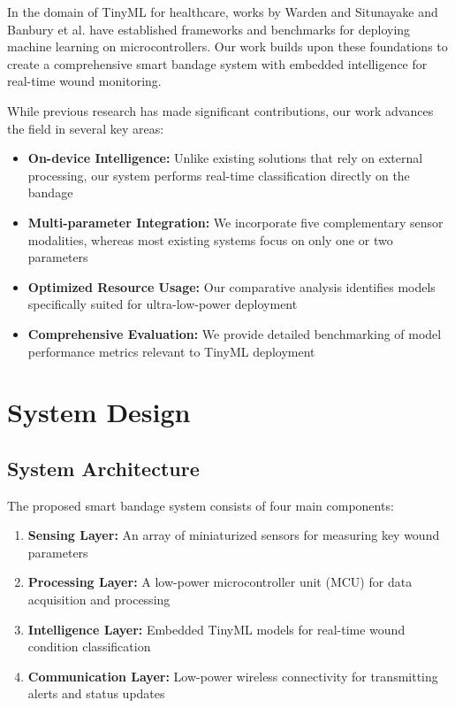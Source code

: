 \documentclass[conference]{IEEEtran}
\begin{document}
In the domain of TinyML for healthcare, works by Warden and Situnayake \cite{warden2019tinyml} and Banbury et al. \cite{banbury2020benchmarking} have established frameworks and benchmarks for deploying machine learning on microcontrollers. Our work builds upon these foundations to create a comprehensive smart bandage system with embedded intelligence for real-time wound monitoring.

While previous research has made significant contributions, our work advances the field in several key areas:
\begin{itemize}
    \item \textbf{On-device Intelligence:} Unlike existing solutions that rely on external processing, our system performs real-time classification directly on the bandage
    \item \textbf{Multi-parameter Integration:} We incorporate five complementary sensor modalities, whereas most existing systems focus on only one or two parameters
    \item \textbf{Optimized Resource Usage:} Our comparative analysis identifies models specifically suited for ultra-low-power deployment
    \item \textbf{Comprehensive Evaluation:} We provide detailed benchmarking of model performance metrics relevant to TinyML deployment
\end{itemize}

\section{System Design}
\subsection{System Architecture}
The proposed smart bandage system consists of four main components:
\begin{enumerate}
    \item \textbf{Sensing Layer:} An array of miniaturized sensors for measuring key wound parameters
    \item \textbf{Processing Layer:} A low-power microcontroller unit (MCU) for data acquisition and processing
    \item \textbf{Intelligence Layer:} Embedded TinyML models for real-time wound condition classification
    \item \textbf{Communication Layer:} Low-power wireless connectivity for transmitting alerts and status updates
\end{enumerate}
\end{document}

